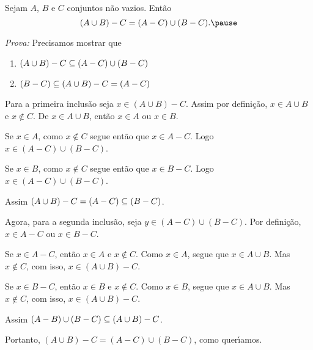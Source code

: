\documentclass{beamer}
\begin{document}
    \begin{frame}
        \begin{proposicao}
            Sejam $A$, $B$ e $C$ \pause conjuntos n\~ao vazios. Ent\~ao\pause
            \[
                (A \cup B) - C = (A - C) \cup (B - C).\pause
            \]
        \end{proposicao}
        \textit{Prova: }\pause
        Precisamos mostrar que\pause
        \begin{enumerate}[label={\arabic*})]
            \item $(A \cup B) - C \subseteq (A - C) \cup (B - C)$\pause
            \item $(B - C) \subseteq (A \cup B) - C = (A - C)$\pause
        \end{enumerate}
        Para a primeira inclus\~ao \pause seja $x \in (A \cup B) - C$. \pause Assim por defini\c{c}\~ao, \pause $x \in A \cup B$ \pause e $x \notin C$. \pause De $x \in A \cup B$, \pause ent\~ao $x \in A$ ou $x \in B$.\pause
        
        Se $x \in A$, \pause como $x \notin C$ \pause segue ent\~ao que $x \in A - C$. \pause Logo $x \in (A - C) \cup (B - C)$.\pause

        Se $x \in B$, \pause como $x \notin C$ \pause segue ent\~ao que $x \in B - C$. \pause Logo $x \in (A - C) \cup (B - C)$.\pause
    \end{frame}

    \begin{frame}
        Assim $(A \cup B) - C = (A - C) \subseteq (B - C)$.\pause
        
        Agora, para a segunda inclus\~ao, \pause seja $y \in (A - C) \cup (B - C)$. \pause Por defini\c{c}\~ao, \pause $x \in A - C$ ou $x \in B - C$.\pause

        Se $x \in A - C$, \pause ent\~ao $x \in A$ e $x \notin C$. \pause Como $x \in A$, \pause segue que $x \in A \cup B$. \pause Mas $x \notin C$, \pause com isso, $x \in (A \cup B) - C$.\pause

        Se $x \in B - C$, \pause ent\~ao $x \in B$ \pause e $x \notin C$. \pause Como $x \in B$, \pause segue que $x \in A \cup B$. \pause Mas $x \notin C$, \pause com isso, $x \in (A \cup B) - C$.\pause
        
        Assim $(A - B) \cup (B - C) \subseteq (A \cup B) - C$.\pause

        Portanto, \pause $(A \cup B) - C = (A - C) \cup (B - C)$, \pause como quer{\'\i}amos.\qedsymbol
    \end{frame}
\end{document}
